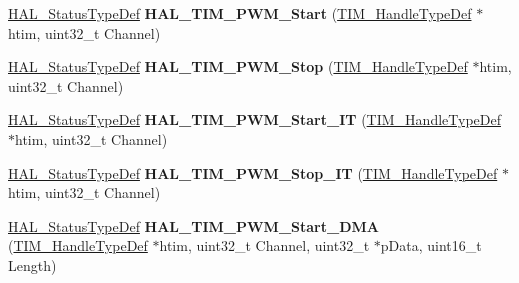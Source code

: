 \begin{DoxyCompactItemize}
\item 
\hyperlink{stm32f4xx__hal__def_8h_a63c0679d1cb8b8c684fbb0632743478f}{H\+A\+L\+\_\+\+Status\+Type\+Def} {\bfseries H\+A\+L\+\_\+\+T\+I\+M\+\_\+\+P\+W\+M\+\_\+\+Start} (\hyperlink{struct_t_i_m___handle_type_def}{T\+I\+M\+\_\+\+Handle\+Type\+Def} $\ast$htim, uint32\+\_\+t Channel)\hypertarget{group___t_i_m___exported___functions___group3_ga11da9bda53a5d21c293bb01da91e592d}{}\label{group___t_i_m___exported___functions___group3_ga11da9bda53a5d21c293bb01da91e592d}

\item 
\hyperlink{stm32f4xx__hal__def_8h_a63c0679d1cb8b8c684fbb0632743478f}{H\+A\+L\+\_\+\+Status\+Type\+Def} {\bfseries H\+A\+L\+\_\+\+T\+I\+M\+\_\+\+P\+W\+M\+\_\+\+Stop} (\hyperlink{struct_t_i_m___handle_type_def}{T\+I\+M\+\_\+\+Handle\+Type\+Def} $\ast$htim, uint32\+\_\+t Channel)\hypertarget{group___t_i_m___exported___functions___group3_gae087011858379feeb770ecb4568829d3}{}\label{group___t_i_m___exported___functions___group3_gae087011858379feeb770ecb4568829d3}

\item 
\hyperlink{stm32f4xx__hal__def_8h_a63c0679d1cb8b8c684fbb0632743478f}{H\+A\+L\+\_\+\+Status\+Type\+Def} {\bfseries H\+A\+L\+\_\+\+T\+I\+M\+\_\+\+P\+W\+M\+\_\+\+Start\+\_\+\+IT} (\hyperlink{struct_t_i_m___handle_type_def}{T\+I\+M\+\_\+\+Handle\+Type\+Def} $\ast$htim, uint32\+\_\+t Channel)\hypertarget{group___t_i_m___exported___functions___group3_gaca1f5fbc35101d0fc7e8af31c9a0c26c}{}\label{group___t_i_m___exported___functions___group3_gaca1f5fbc35101d0fc7e8af31c9a0c26c}

\item 
\hyperlink{stm32f4xx__hal__def_8h_a63c0679d1cb8b8c684fbb0632743478f}{H\+A\+L\+\_\+\+Status\+Type\+Def} {\bfseries H\+A\+L\+\_\+\+T\+I\+M\+\_\+\+P\+W\+M\+\_\+\+Stop\+\_\+\+IT} (\hyperlink{struct_t_i_m___handle_type_def}{T\+I\+M\+\_\+\+Handle\+Type\+Def} $\ast$htim, uint32\+\_\+t Channel)\hypertarget{group___t_i_m___exported___functions___group3_ga0559af125dc5fb2bb183a6a4b86808b5}{}\label{group___t_i_m___exported___functions___group3_ga0559af125dc5fb2bb183a6a4b86808b5}

\item 
\hyperlink{stm32f4xx__hal__def_8h_a63c0679d1cb8b8c684fbb0632743478f}{H\+A\+L\+\_\+\+Status\+Type\+Def} {\bfseries H\+A\+L\+\_\+\+T\+I\+M\+\_\+\+P\+W\+M\+\_\+\+Start\+\_\+\+D\+MA} (\hyperlink{struct_t_i_m___handle_type_def}{T\+I\+M\+\_\+\+Handle\+Type\+Def} $\ast$htim, uint32\+\_\+t Channel, uint32\+\_\+t $\ast$p\+Data, uint16\+\_\+t Length)\hypertarget{group___t_i_m___exported___functions___group3_gaa4b542b3c0ae347ea580c9e7c8e88b17}{}\label{group___t_i_m___exported___functions___group3_gaa4b542b3c0ae347ea580c9e7c8e88b17}


\end{DoxyCompactItemize}
